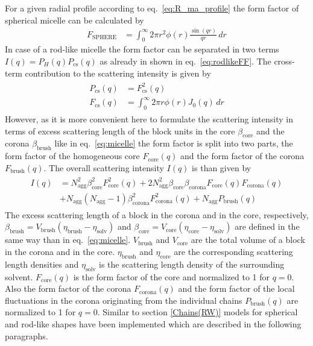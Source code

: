 For a given radial profile according to eq.\ \ref{eq:R_ma_profile} the form factor of
spherical micelle can be calculated by
\begin{align}
F_\text{SPHERE} &= \int_0^\infty 2\pi r^2 \phi(r) \frac{\sin(qr)}{qr}\,dr
\end{align}
In case of a rod-like micelle the form factor can be separated in two terms
$I(q) = P_H(q)P_\text{cs}(q)$ as already in shown in eq.\ \ref{eq:rodlikeFF}.
The cross-term contribution to the scattering intensity is given by
\begin{align}
\begin{split}
P_\text{cs}(q) &=  F_\text{cs}^2(q) \\
F_\text{cs}(q) &=  \int_0^\infty 2\pi r \phi(r) J_0(q)\,dr
\end{split}
\end{align}
However, as it is more convenient here to formulate the scattering intensity in
terms of excess scattering length of the block units in the core $\beta_\text{core}$
and the corona $\beta_\text{brush}$ like in eq.\ \ref{eq:micelle} the form factor
is split into two parts, the form factor of the homogeneous core $F_\text{core}(q)$ and
the form factor of the corona $F_\text{brush}(q)$. The overall scattering intensity $I(q)$
is than given by
\begin{align}
\begin{split}
I(q) &=   N_\text{agg}^2\beta_\text{core}^2 F_\text{core}^2(q)
       + 2 N_\text{agg}^2\beta_\text{core}\beta_\text{corona} F_\text{core}(q) F_\text{corona}(q) \\
     & +   N_\text{agg}(N_\text{agg}-1) \beta_\text{corona}^2 F_\text{corona}^2(q)
       +   N_\text{agg} P_\text{brush}(q)
\end{split}
\label{masterR_ma}
\end{align}
The excess scattering length of a block in the corona and in the core, respectively,
$\beta_\text{brush}=V_\text{brush}(\eta_\text{brush}-\eta_\text{solv})$
and $\beta_\text{core}=V_\text{core}(\eta_\text{core}-\eta_\text{solv})$ are
defined in the same way than in eq.\ \ref{eq:micelle}.
$V_\text{brush}$ and $V_\text{core}$ are the total volume of a block in the corona
and in the core. $\eta_\text{brush}$ and $\eta_\text{core}$ are the corresponding
scattering length densities and $\eta_\text{solv}$ is the scattering length
density of the surrounding solvent. $F_\text{core}(q)$ is the form factor of the core and
normalized to 1 for $q=0$. Also the form factor of the corona $F_\text{corona}(q)$ and the
form factor of the local fluctuations in the corona originating from the individual chains
$P_\text{brush}(q)$ are normalized to 1 for $q=0$. Similar to section \ref{Chains(RW)}
models for spherical and rod-like shapes have been implemented which are described in the
following paragraphs.


